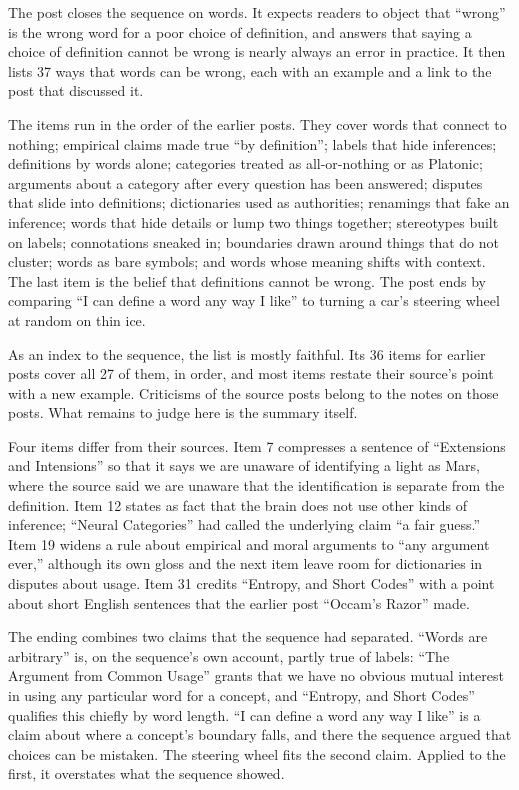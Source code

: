 \begin{afterword}
\summaryhead

The post closes the sequence on words. It expects readers to object that ``wrong'' is the wrong word for a poor choice of definition, and answers that saying a choice of definition cannot be wrong is nearly always an error in practice. It then lists 37 ways that words can be wrong, each with an example and a link to the post that discussed it.

The items run in the order of the earlier posts. They cover words that connect to nothing; empirical claims made true ``by definition''; labels that hide inferences; definitions by words alone; categories treated as all-or-nothing or as Platonic; arguments about a category after every question has been answered; disputes that slide into definitions; dictionaries used as authorities; renamings that fake an inference; words that hide details or lump two things together; stereotypes built on labels; connotations sneaked in; boundaries drawn around things that do not cluster; words as bare symbols; and words whose meaning shifts with context. The last item is the belief that definitions cannot be wrong. The post ends by comparing ``I can define a word any way I like'' to turning a car's steering wheel at random on thin ice.

\responsehead

As an index to the sequence, the list is mostly faithful. Its 36 items for earlier posts cover all 27 of them, in order, and most items restate their source's point with a new example. Criticisms of the source posts belong to the notes on those posts. What remains to judge here is the summary itself.

Four items differ from their sources. Item 7 compresses a sentence of ``Extensions and Intensions'' so that it says we are unaware of identifying a light as Mars, where the source said we are unaware that the identification is separate from the definition. Item 12 states as fact that the brain does not use other kinds of inference; ``Neural Categories'' had called the underlying claim ``a fair guess.'' Item 19 widens a rule about empirical and moral arguments to ``any argument ever,'' although its own gloss and the next item leave room for dictionaries in disputes about usage. Item 31 credits ``Entropy, and Short Codes'' with a point about short English sentences that the earlier post ``Occam's Razor'' made.

The ending combines two claims that the sequence had separated. ``Words are arbitrary'' is, on the sequence's own account, partly true of labels: ``The Argument from Common Usage'' grants that we have no obvious mutual interest in using any particular word for a concept, and ``Entropy, and Short Codes'' qualifies this chiefly by word length. ``I can define a word any way I like'' is a claim about where a concept's boundary falls, and there the sequence argued that choices can be mistaken. The steering wheel fits the second claim. Applied to the first, it overstates what the sequence showed.


\end{afterword}
